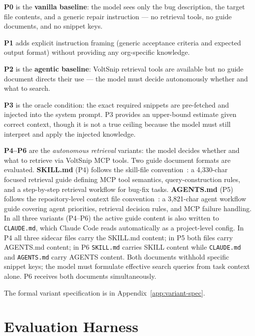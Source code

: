 \documentclass[10pt,a4paper,twocolumn]{article}
\begin{document}
\textbf{P0} is the \textbf{vanilla baseline}: the model sees only the bug
description, the target file contents, and a generic repair instruction
--- no retrieval tools, no guide documents, and no snippet keys.

\textbf{P1} adds explicit instruction framing (generic acceptance criteria
and expected output format) without providing any org-specific knowledge.

\textbf{P2} is the \textbf{agentic baseline}: VoltSnip retrieval tools are
available but no guide document directs their use --- the model must decide
autonomously whether and what to search.

\textbf{P3} is the oracle condition: the exact required snippets are
pre-fetched and injected into the system prompt.
P3 provides an upper-bound estimate given correct context, though it is
not a true ceiling because the model must still interpret and apply the
injected knowledge.

\textbf{P4--P6} are the \emph{autonomous retrieval} variants: the model
decides whether and what to retrieve via VoltSnip MCP tools.
Two guide document formats are evaluated.
\textbf{SKILL.md} (P4) follows the skill-file
convention~\citep{li2026skillsbench}: a 4,330-char focused retrieval guide
defining MCP tool semantics, query-construction rules, and a step-by-step
retrieval workflow for bug-fix tasks.
\textbf{AGENTS.md} (P5) follows the repository-level context file
convention~\citep{gloaguen2026agentsmd}: a 3,821-char agent workflow guide
covering agent priorities, retrieval decision rules, and MCP failure
handling.
In all three variants (P4--P6) the active guide content is also written
to \texttt{CLAUDE.md}, which Claude Code reads automatically as a
project-level config.
In P4 all three sidecar files carry the SKILL.md content; in P5 both files
carry AGENTS.md content; in P6 \texttt{SKILL.md} carries SKILL content
while \texttt{CLAUDE.md} and \texttt{AGENTS.md} carry AGENTS content.
Both documents withhold specific snippet keys; the model must formulate
effective search queries from task context alone.
P6 receives both documents simultaneously.

The formal variant specification is in Appendix~\ref{app:variant-spec}.

\section{Evaluation Harness}
\label{sec:harness}
\end{document}
